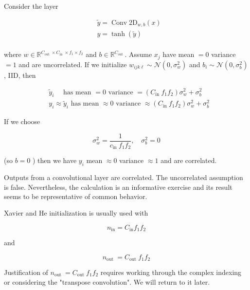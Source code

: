 \begin{definition}
    Consider the layer

    $$
    \begin{aligned}
    & \tilde{y}=\operatorname{Conv} 2 \mathrm{D}_{w, b}(x) \\
    & y=\tanh (\tilde{y}) \\
    \end{aligned}
    $$

    where $w \in \mathbb{R}^{C_{\text {out }} \times C_{\text {in }} \times f_{1} \times f_{2}}$ and $b \in \mathbb{R}^{C_{\text {out }}}$. Assume $x_{j}$ have mean $=0$ variance $=1$ and are uncorrelated. If we initialize $w_{i j k \ell} \sim \mathcal{N}\left(0, \sigma_{w}^{2}\right)$ and $b_{i} \sim \mathcal{N}\left(0, \sigma_{b}^{2}\right)$, IID, then

    $$
    \begin{aligned}
    & \tilde{y}_{i} \quad \text { has mean }=0 \text { variance }=\left(C_{\text {in }} f_{1} f_{2}\right) \sigma_{w}^{2}+\sigma_{b}^{2} \\
    & y_{i} \approx \tilde{y}_{i} \text { has mean } \approx 0 \text { variance } \approx\left(C_{\text {in }} f_{1} f_{2}\right) \sigma_{w}^{2}+\sigma_{b}^{2}
    \end{aligned}
    $$

    If we choose

    $$
    \sigma_{w}^{2}=\frac{1}{c_{\text {in }} f_{1} f_{2}}, \quad \sigma_{b}^{2}=0
    $$

    (so $b=0$ ) then we have $y_{i}$ mean $\approx 0$ variance $\approx 1$ and are correlated.

    \par\noindent\textcolor{gray}{\hdashrule{\textwidth}{0.4pt}{1pt 2pt}}

    Outputs from a convolutional layer are correlated. The uncorrelated assumption is false. Nevertheless, the calculation is an informative exercise and its result seems to be representative of common behavior.

    Xavier and He initialization is usually used with

    $$
    n_{\mathrm{in}}=C_{\mathrm{in}} f_{1} f_{2}
    $$

    and

    $$
    n_{\text {out }}=C_{\text {out }} f_{1} f_{2}
    $$

    Justification of $n_{\text {out }}=C_{\text {out }} f_{1} f_{2}$ requires working through the complex indexing or considering the "transpose convolution". We will return to it later.
\end{definition}

